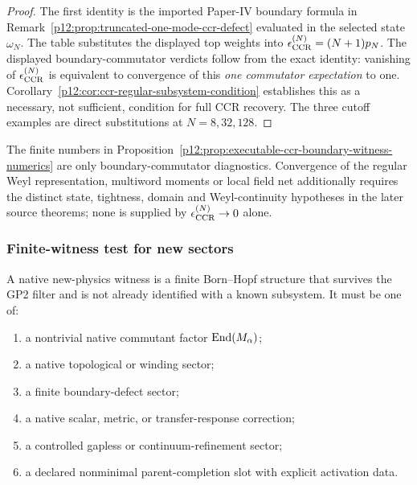 \documentclass[12pt,a4paper]{article}
\begin{document}
\begin{proof}
The first identity is the imported Paper-IV boundary formula in Remark~\ref{p12:prop:truncated-one-mode-ccr-defect} evaluated in the selected state \(\omega_N\).  The table substitutes the displayed top weights into \(\epsilon_{\rm CCR}^{(N)}=(N+1)p_N\).  The displayed boundary-commutator verdicts follow from the exact identity: vanishing of \(\epsilon_{\rm CCR}^{(N)}\) is equivalent to convergence of this \emph{one commutator expectation} to one. Corollary~\ref{p12:cor:ccr-regular-subsystem-condition} establishes this as a necessary, not sufficient, condition for full CCR recovery.  The three cutoff examples are direct substitutions at \(N=8,32,128\).\qedhere
\end{proof}
\begin{remark}
The finite numbers in Proposition~\ref{p12:prop:executable-ccr-boundary-witness-numerics}
are only boundary-commutator diagnostics. Convergence of the regular Weyl
representation, multiword moments or local field net additionally requires
the distinct state, tightness, domain and Weyl-continuity hypotheses in the
later source theorems; none is supplied by \(\epsilon_{\rm CCR}^{(N)}\to0\)
alone.
\end{remark}


\subsubsection{Finite-witness test for new sectors}

\begin{definition}
\label{p12:def:native-new-physics-witness}
A native new-physics witness is a finite Born--Hopf structure that survives the GP2 filter and is not already identified with a known subsystem.  It must be one of:
\begin{enumerate}[label=(\roman*), leftmargin=2em]
\item a nontrivial native commutant factor \(\operatorname{End}(M_\alpha)\);
\item a native topological or winding sector;
\item a finite boundary-defect sector;
\item a native scalar, metric, or transfer-response correction;
\item a controlled gapless or continuum-refinement sector;
\item a declared nonminimal parent-completion slot with explicit activation data.
\end{enumerate}
\end{definition}
\end{document}
